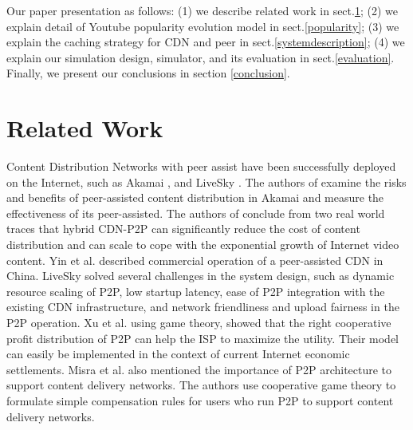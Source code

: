 \documentclass[conference]{IEEEtran}
\begin{document}
Our paper presentation as follows: (1) we describe related work in sect.\ref{relatedwork}; (2) we explain detail of Youtube popularity evolution model in sect.\ref{popularity}; (3) we explain the caching strategy for CDN and peer in sect.\ref{systemdescription}; (4) we explain our simulation design, simulator, and its evaluation in sect.\ref{evaluation}.
Finally, we present our conclusions in section \ref{conclusion}.




\section{Related Work}\label{relatedwork}
Content Distribution Networks with peer assist have been successfully deployed on the Internet, such as Akamai \cite{Zhao:2013:PCD:2504730.2504752}, \cite{Huang:2008:UHC:1496046.1496064} and LiveSky \cite{Yin:2010:LEC:1823746.1823750}.  
The authors of \cite{Zhao:2013:PCD:2504730.2504752} examine the risks and benefits of peer-assisted content distribution in Akamai and measure the effectiveness of its peer-assisted. 
The authors of \cite{Huang:2008:UHC:1496046.1496064} conclude from two real world traces that hybrid CDN-P2P can significantly reduce the cost of content distribution and can scale to cope with the exponential growth of Internet video content.  
Yin et al. \cite{Yin:2010:LEC:1823746.1823750} described commercial operation of a peer-assisted CDN in China.  
LiveSky solved several challenges in the system design, such as dynamic resource scaling of P2P, low startup latency, ease of P2P integration with the existing CDN infrastructure, and network friendliness and upload fairness in the P2P operation.  
Xu et al.\cite{DBLP:journals/corr/abs-1212-4915} using game theory, showed that the right cooperative profit distribution of P2P can help the ISP to maximize the utility.  
Their model can easily be implemented in the context of current Internet economic settlements.  
Misra et al.\cite{Misra:2010:IPS:1811099.1811064} also mentioned the importance of P2P architecture to support content delivery networks.
The authors use cooperative game theory to formulate simple compensation rules for users who run P2P to support content delivery networks.
\end{document}
